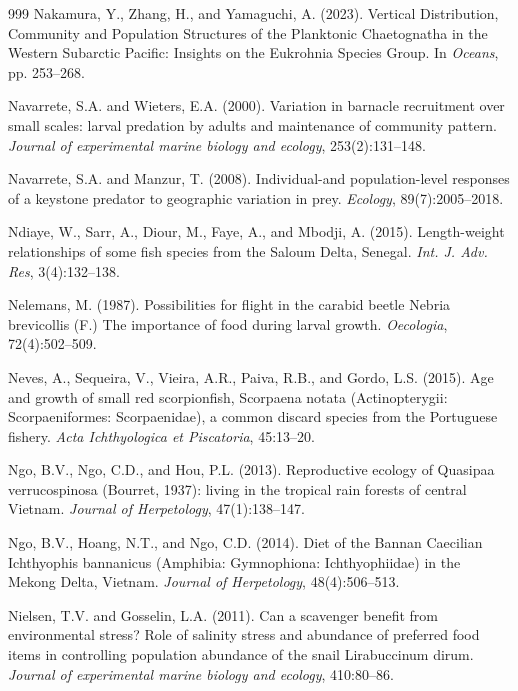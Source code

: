 \begin{thebibliography}{999}
Nakamura, Y., Zhang, H., and Yamaguchi, A. (2023). Vertical Distribution, Community and Population Structures of the Planktonic Chaetognatha in the Western Subarctic Pacific: Insights on the Eukrohnia Species Group. In \textit{Oceans}, pp. 253--268.

Navarrete, S.A. and Wieters, E.A. (2000). Variation in barnacle recruitment over small scales: larval predation by adults and maintenance of community pattern. \textit{Journal of experimental marine biology and ecology}, 253(2):131--148.

Navarrete, S.A. and Manzur, T. (2008). Individual-and population-level responses of a keystone predator to geographic variation in prey. \textit{Ecology}, 89(7):2005--2018.

Ndiaye, W., Sarr, A., Diour, M., Faye, A., and Mbodji, A. (2015). Length-weight relationships of some fish species from the Saloum Delta, Senegal. \textit{Int. J. Adv. Res}, 3(4):132--138.

Nelemans, M. (1987). Possibilities for flight in the carabid beetle Nebria brevicollis (F.) The importance of food during larval growth. \textit{Oecologia}, 72(4):502--509.

Neves, A., Sequeira, V., Vieira, A.R., Paiva, R.B., and Gordo, L.S. (2015). Age and growth of small red scorpionfish, Scorpaena notata (Actinopterygii: Scorpaeniformes: Scorpaenidae), a common discard species from the Portuguese fishery. \textit{Acta Ichthyologica et Piscatoria}, 45:13--20.

Ngo, B.V., Ngo, C.D., and Hou, P.L. (2013). Reproductive ecology of Quasipaa verrucospinosa (Bourret, 1937): living in the tropical rain forests of central Vietnam. \textit{Journal of Herpetology}, 47(1):138--147.

Ngo, B.V., Hoang, N.T., and Ngo, C.D. (2014). Diet of the Bannan Caecilian Ichthyophis bannanicus (Amphibia: Gymnophiona: Ichthyophiidae) in the Mekong Delta, Vietnam. \textit{Journal of Herpetology}, 48(4):506--513.

Nielsen, T.V. and Gosselin, L.A. (2011). Can a scavenger benefit from environmental stress? Role of salinity stress and abundance of preferred food items in controlling population abundance of the snail Lirabuccinum dirum. \textit{Journal of experimental marine biology and ecology}, 410:80--86.


\end{thebibliography}
